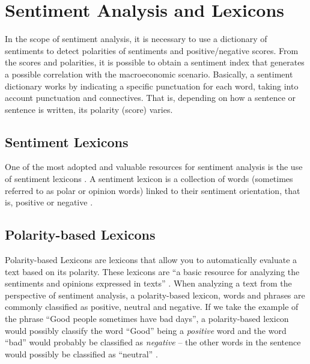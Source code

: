 \section{Sentiment Analysis and Lexicons}

In the scope of sentiment analysis, it is necessary to use a dictionary of sentiments to detect polarities of sentiments and positive/negative scores. From the scores and polarities, it is possible to obtain a sentiment index that generates a possible correlation with the macroeconomic scenario. Basically, a sentiment dictionary works by indicating a specific punctuation for each word, taking into account punctuation and connectives. That is, depending on how a sentence or sentence is written, its polarity (score) varies.\\


\subsection{Sentiment Lexicons} \label{sec:lexicons}
One of the most adopted and valuable resources for sentiment analysis is the use of sentiment lexicons \cite[]{ahire2014survey, nusko2016building, cambria2013new, kaity2020sentiment}. A sentiment lexicon is a collection of words (sometimes referred to as polar or opinion words) linked to their sentiment orientation, that is, positive or negative \cite[]{kaity2020sentiment, medhat2014sentiment}.


\subsection{Polarity-based Lexicons} \label{subsec:polbas}

Polarity-based Lexicons are lexicons that allow you to automatically evaluate a text based on its polarity. These lexicons are ``a basic resource for analyzing the sentiments and opinions expressed in texts'' \cite[p.938]{san2016polarity}. When analyzing a text from the perspective of sentiment analysis, a polarity-based lexicon, words and phrases are commonly classified as positive, neutral and negative. If we take the example of the phrase ``Good people sometimes have bad days'', a polarity-based lexicon would possibly classify the word ``Good'' being a \textit{positive} word and the word ``bad'' would probably be classified as \textit{negative} -- the other words in the sentence would possibly be classified as ``neutral'' \cite[]{BCDG07}.\\

